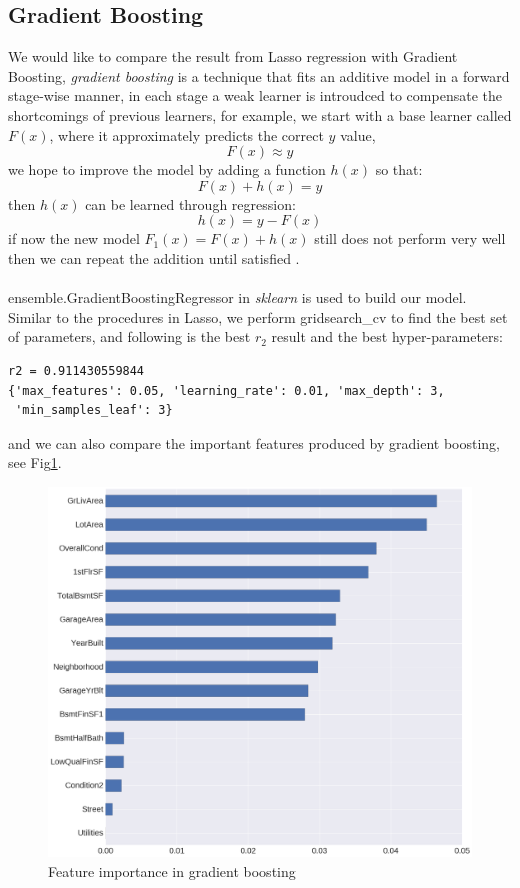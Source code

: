 \documentclass[12pt]{article}
\begin{document}
\subsection{Gradient Boosting}
We would like to compare the result from Lasso regression with Gradient Boosting, \textit{gradient boosting} is a technique that fits an additive model in a forward stage-wise manner, in each stage a weak learner is introudced to compensate the shortcomings of previous learners, for example, we start with a base learner called $F(x)$, where it approximately predicts the correct $y$ value, 
\begin{equation*}
	F(x) \approx y
\end{equation*}
we hope to improve the model by adding a function $h(x)$ so that:
\begin{equation*}
F(x) + h(x) = y
\end{equation*}
then $h(x)$ can be learned through regression:
\begin{equation*}
h(x) = y-F(x)
\end{equation*}
if now the new model $F_1(x)=F(x)+h(x)$ still does not perform very well then we can repeat the addition until satisfied \cite{gb_explain}.\\
\\
ensemble.GradientBoostingRegressor\cite{gb} in \textit{sklearn} is used to build our model. Similar to the procedures in Lasso, we perform gridsearch\_cv to find the best set of parameters, and following is the best $r_2$ result and the best hyper-parameters:
\begin{verbatim}
r2 = 0.911430559844
{'max_features': 0.05, 'learning_rate': 0.01, 'max_depth': 3,
 'min_samples_leaf': 3}
\end{verbatim}
and we can also compare the important features produced by gradient boosting, see Fig\ref{fig:7}.\\
\begin{figure}[h!]
	\centering
	\includegraphics[width=0.8\linewidth]{gb_imp.png}
	\caption{Feature importance in gradient boosting}
	\label{fig:7}
\end{figure}
\end{document}
